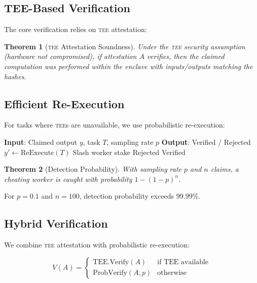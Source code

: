 \documentclass[11pt,letterpaper]{article}
\newtheorem{theorem}{Theorem}[section]
\newcommand{\TEE}{\textsc{tee}}
\begin{document}
\subsection{TEE-Based Verification}

The core verification relies on \TEE{} attestation:

\begin{theorem}[\TEE{} Attestation Soundness]
Under the \TEE{} security assumption (hardware not compromised), if attestation $A$ verifies, then the claimed computation was performed within the enclave with inputs/outputs matching the hashes.
\end{theorem}

\subsection{Efficient Re-Execution}

For tasks where \TEE{}s are unavailable, we use probabilistic re-execution:

\begin{algorithm}[t]
\caption{Probabilistic Verification}
\label{alg:prob-verify}
\begin{algorithmic}[1]
\STATE \textbf{Input}: Claimed output $y$, task $T$, sampling rate $p$
\STATE \textbf{Output}: Verified / Rejected
    \STATE $y' \leftarrow \text{ReExecute}(T)$
        \STATE Slash worker stake
        \RETURN Rejected
    \ENDIF
\ENDIF
\RETURN Verified
\end{algorithmic}
\end{algorithm}

\begin{theorem}[Detection Probability]
With sampling rate $p$ and $n$ claims, a cheating worker is caught with probability $1 - (1-p)^n$.
\end{theorem}

For $p = 0.1$ and $n = 100$, detection probability exceeds 99.99\%.

\subsection{Hybrid Verification}

We combine \TEE{} attestation with probabilistic re-execution:

\begin{equation}
V(A) = \begin{cases}
\text{TEE.Verify}(A) & \text{if TEE available} \\
\text{ProbVerify}(A, p) & \text{otherwise}
\end{cases}
\end{equation}
\end{document}
